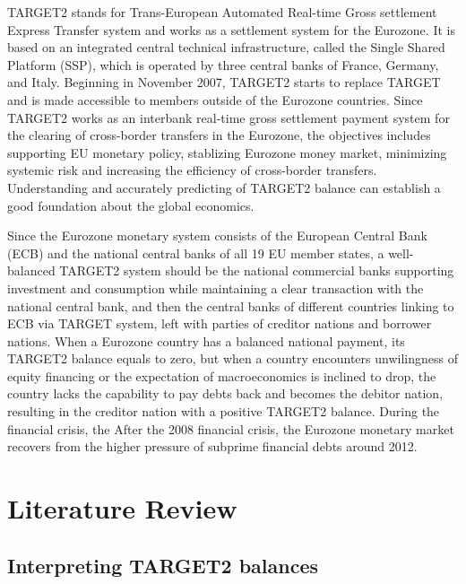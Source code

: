 \documentclass[12pt]{article}
\begin{document}
TARGET2 stands for Trans-European Automated Real-time Gross settlement Express Transfer system and works as a settlement system for the Eurozone. It is based on an integrated central technical infrastructure, called the Single Shared Platform (SSP), which is operated by three central banks of France, Germany, and Italy. Beginning in November 2007, TARGET2 starts to replace TARGET and is made accessible to members outside of the Eurozone countries. Since TARGET2 works as an interbank real-time gross settlement payment system for the clearing of cross-border transfers in the Eurozone, the objectives includes supporting EU monetary policy, stablizing Eurozone money market, minimizing systemic risk and increasing the efficiency of cross-border transfers. Understanding and accurately predicting of TARGET2 balance can establish a good foundation about the global economics. 

Since the Eurozone monetary system consists of the European Central Bank (ECB) and the national central banks of all 19 EU member states, a well-balanced TARGET2 system should be the national commercial banks supporting investment and consumption while maintaining a clear transaction with the national central bank, and then the central banks of different countries linking to ECB via TARGET system, left with parties of creditor nations and borrower nations. When a Eurozone country has a balanced national payment, its TARGET2 balance equals to zero, but when a country encounters unwilingness of equity financing or the expectation of macroeconomics is inclined to drop, the country lacks the capability to pay debts back and becomes the debitor nation, resulting in the creditor nation with a positive TARGET2 balance. During the financial crisis, the After the 2008 financial crisis, the Eurozone monetary market recovers from the higher pressure of subprime financial debts around 2012. 


\section{Literature Review} \label{sec:literature}
\subsection{Interpreting TARGET2 balances}
\end{document}
